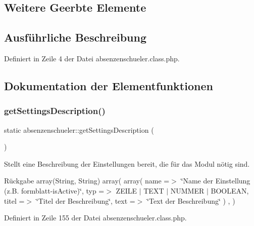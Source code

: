 \subsection*{Weitere Geerbte Elemente}


\subsection{Ausführliche Beschreibung}


Definiert in Zeile 4 der Datei absenzenschueler.\+class.\+php.



\subsection{Dokumentation der Elementfunktionen}
\mbox{\label{classabsenzenschueler_a6936ce72f42d0d3e3a0d282dab0d4d81}} 
\subsubsection{\texorpdfstring{get\+Settings\+Description()}{getSettingsDescription()}}
{\footnotesize\ttfamily static absenzenschueler\+::get\+Settings\+Description (\begin{DoxyParamCaption}{ }\end{DoxyParamCaption})\hspace{0.3cm}{\ttfamily [static]}}

Stellt eine Beschreibung der Einstellungen bereit, die für das Modul nötig sind. \begin{DoxyReturn}{Rückgabe}
array(\+String, String) array( array( \textquotesingle{}name\textquotesingle{} =$>$ \char`\"{}\+Name der Einstellung (z.\+B. formblatt-\/is\+Active)\char`\"{}, \textquotesingle{}typ\textquotesingle{} =$>$ Z\+E\+I\+LE $\vert$ T\+E\+XT $\vert$ N\+U\+M\+M\+ER $\vert$ B\+O\+O\+L\+E\+AN, \textquotesingle{}titel\textquotesingle{} =$>$ \char`\"{}\+Titel der Beschreibung\char`\"{}, \textquotesingle{}text\textquotesingle{} =$>$ \char`\"{}\+Text der Beschreibung\char`\"{} ) , ) 
\end{DoxyReturn}


Definiert in Zeile 155 der Datei absenzenschueler.\+class.\+php.

\mbox{\label{classabsenzenschueler_a252619a587fb18bcd1ade0d2bd9a0c3e}} 
